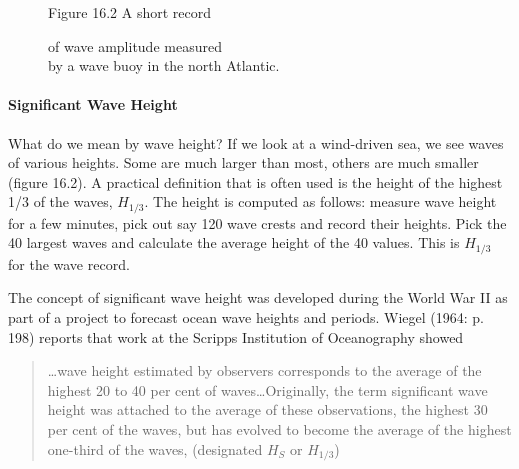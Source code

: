 \begin{figure}[h!]
\vspace{1ex}
\centering
\footnotesize
Figure 16.2 A short record \rule{0mm}{3ex}of wave amplitude
measured\\ by a wave buoy in the north Atlantic.

\label{fig:waveheight}
\vspace{-1ex}
\end{figure}

\paragraph{Significant Wave Height}
What do we mean by wave height? If we
look at a wind-driven sea, we see waves of various heights. Some are
much larger than most, others are much smaller (figure 16.2). A
practical definition that is often used is the height of the highest
1/3 of the waves, $H_{1/3}$. The height is computed as follows:
measure wave height for a few minutes, pick out say 120 wave crests
and record their heights. Pick the 40 largest waves and calculate the
average height of the 40 values. This is $H_{1/3}$ for the wave
record.

The concept of significant wave height was developed during the World
War II as part of a project to forecast ocean wave heights and
periods. Wiegel (1964: p.  198) reports that work at the Scripps
Institution of Oceanography showed
\begin{quote} \small
\ldots wave height estimated by observers corresponds to the average
of the highest 20 to 40 per cent of waves\ldots Originally, the term
significant wave height was attached to the average of these
observations, the highest 30 per cent of the waves, but has evolved to
become the average of the highest one-third of the waves, (designated
$H_S$ or $H_{1/3}$)
\end{quote}

